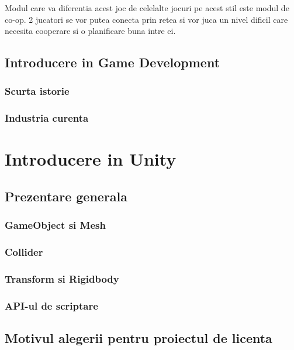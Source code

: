 \documentclass[12pt, a4paper]{article}
\begin{document}
	Modul care va diferentia acest joc de celelalte jocuri pe acest stil este modul de co-op. 2 jucatori se vor putea conecta prin retea si vor juca un nivel dificil care necesita cooperare si o planificare buna intre ei.
	
	\subsection{Introducere in Game Development}
	
	\subsubsection{Scurta istorie}
	
	\subsubsection{Industria curenta}
	
	
	
	\section{Introducere in Unity}
	
	\subsection{Prezentare generala}
	
	
	\subsubsection{GameObject si Mesh}
	
	\subsubsection{Collider}
	
	\subsubsection{Transform si Rigidbody}
	
	\subsubsection{API-ul de scriptare}
	
	\subsection{Motivul alegerii pentru proiectul de licenta}
\end{document}
